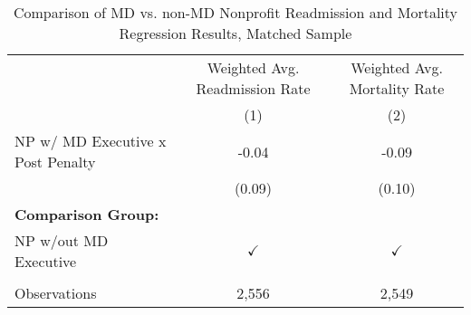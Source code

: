 \begin{table}[htbp]
   \caption{\label{tab:MD_noMD_matchsample} Comparison of MD vs. non-MD Nonprofit Readmission and Mortality Regression Results, Matched Sample}
   \bigskip
   \centering
   \begin{tabular}{lcc}
      \toprule
                                        & Weighted Avg. Readmission Rate & Weighted Avg. Mortality Rate\\  
                                        & (1)                            & (2)\\  
      \midrule 
      NP w/ MD Executive x Post Penalty & -0.04                          & -0.09\\   
                                        & (0.09)                         & (0.10)\\   
      \textbf{Comparison Group:}        &                                & \\  
      NP w/out MD Executive             & $\checkmark$                   & $\checkmark$\\   
       \\
      Observations                      & 2,556                          & 2,549\\  
      \bottomrule
   \end{tabular}
\end{table}
